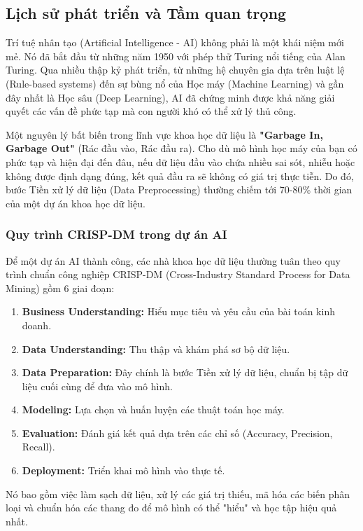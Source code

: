 \subsection{Lịch sử phát triển và Tầm quan trọng}
Trí tuệ nhân tạo (Artificial Intelligence - AI) không phải là một khái niệm mới mẻ. Nó đã bắt đầu từ những năm 1950 với phép thử Turing nổi tiếng của Alan Turing. Qua nhiều thập kỷ phát triển, từ những hệ chuyên gia dựa trên luật lệ (Rule-based systems) đến sự bùng nổ của Học máy (Machine Learning) và gần đây nhất là Học sâu (Deep Learning), AI đã chứng minh được khả năng giải quyết các vấn đề phức tạp mà con người khó có thể xử lý thủ công.

Một nguyên lý bất biến trong lĩnh vực khoa học dữ liệu là \textbf{"Garbage In, Garbage Out"} (Rác đầu vào, Rác đầu ra). Cho dù mô hình học máy của bạn có phức tạp và hiện đại đến đâu, nếu dữ liệu đầu vào chứa nhiều sai sót, nhiễu hoặc không được định dạng đúng, kết quả đầu ra sẽ không có giá trị thực tiễn. Do đó, bước Tiền xử lý dữ liệu (Data Preprocessing) thường chiếm tới 70-80\% thời gian của một dự án khoa học dữ liệu.

\subsubsection{Quy trình CRISP-DM trong dự án AI}
Để một dự án AI thành công, các nhà khoa học dữ liệu thường tuân theo quy trình chuẩn công nghiệp CRISP-DM (Cross-Industry Standard Process for Data Mining) gồm 6 giai đoạn:
\begin{enumerate}
    \item \textbf{Business Understanding:} Hiểu mục tiêu và yêu cầu của bài toán kinh doanh.
    \item \textbf{Data Understanding:} Thu thập và khám phá sơ bộ dữ liệu.
    \item \textbf{Data Preparation:} Đây chính là bước Tiền xử lý dữ liệu, chuẩn bị tập dữ liệu cuối cùng để đưa vào mô hình.
    \item \textbf{Modeling:} Lựa chọn và huấn luyện các thuật toán học máy.
    \item \textbf{Evaluation:} Đánh giá kết quả dựa trên các chỉ số (Accuracy, Precision, Recall).
    \item \textbf{Deployment:} Triển khai mô hình vào thực tế.
\end{enumerate}
Nó bao gồm việc làm sạch dữ liệu, xử lý các giá trị thiếu, mã hóa các biến phân loại và chuẩn hóa các thang đo để mô hình có thể "hiểu" và học tập hiệu quả nhất.

